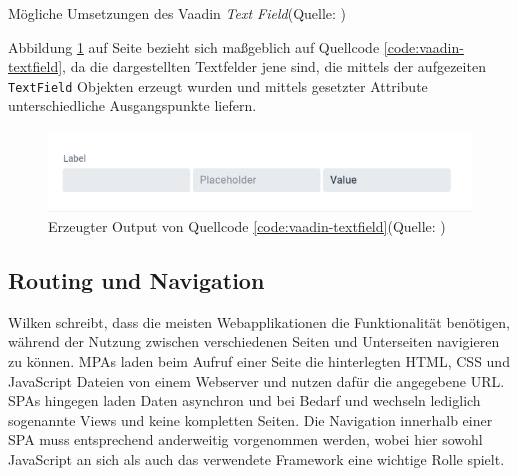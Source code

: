 \documentclass[a4paper,12pt,twoside]{scrreprt}
\begin{document}
\begin{listing}[ht]
    \inputminted[fontsize=\footnotesize,linenos]{java}{code/Vaadin_text-field_sample.java}
    \caption[Mögliche Umsetzungen des Vaadin \textit{Text Field}]{Mögliche Umsetzungen des Vaadin \textit{Text Field}\newline(Quelle: \cite[][\enquote{Text Field} - Examples]{vaadin_ltd_mobile_nodate})}
    \label{code:vaadin-textfield}
\end{listing}

Abbildung \ref{fig:vaadin-textfield-output} auf Seite \pageref{fig:vaadin-textfield-output} bezieht sich maßgeblich auf Quellcode \ref{code:vaadin-textfield}, da die dargestellten Textfelder jene sind, die mittels der aufgezeiten \texttt{TextField} Objekten erzeugt wurden und mittels gesetzter Attribute unterschiedliche Ausgangspunkte liefern.

\begin{figure}[ht]
    \centering
    \includegraphics[scale=0.7]{images/Vaadin_text-field_output_Vaadin.png}
    \caption[Erzeugter Output von Quellcode \ref{code:vaadin-textfield}]{Erzeugter Output von Quellcode \ref{code:vaadin-textfield}\newline(Quelle: \cite[][\enquote{Text Field} - Examples]{vaadin_ltd_mobile_nodate})}
    \label{fig:vaadin-textfield-output}
\end{figure}

\subsection{Routing und Navigation}
\label{sub-sec:routing-navigation}
Wilken schreibt, dass die meisten Webapplikationen die Funktionalität benötigen, während der Nutzung zwischen verschiedenen Seiten und Unterseiten navigieren zu können. \acp{MPA} laden beim Aufruf einer Seite die hinterlegten HTML, CSS und JavaScript Dateien von einem Webserver und nutzen dafür die angegebene URL. \acp{SPA} hingegen laden Daten asynchron und bei Bedarf und wechseln lediglich sogenannte Views und keine kompletten Seiten. Die Navigation innerhalb einer \ac{SPA} muss entsprechend anderweitig vorgenommen werden, wobei hier sowohl JavaScript an sich als auch das verwendete Framework eine wichtige Rolle spielt. \parencite[][Seite 159f.]{wilken_angular_2018}
\end{document}
